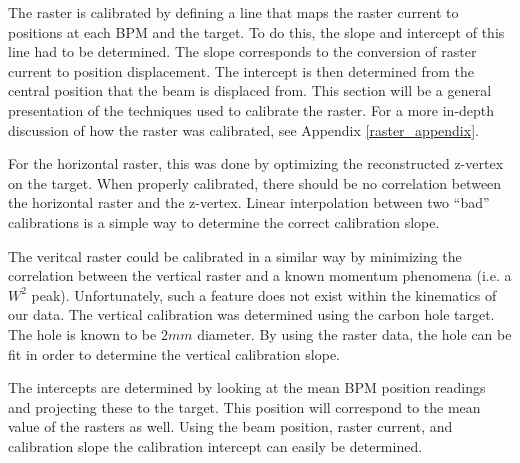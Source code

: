 The raster is calibrated by defining a line that maps the raster current to positions at each BPM and the target. To do this, the slope and intercept of this line had to be determined. The slope corresponds to the conversion of raster current to position displacement. The intercept is then determined from the central position that the beam is displaced from. This section will be a general presentation of the techniques used to calibrate the raster. For a more in-depth discussion of how the raster was calibrated, see Appendix \ref{raster_appendix}.

For the horizontal raster, this was done by optimizing the reconstructed z-vertex on the target. When properly calibrated, there should be no correlation between the horizontal raster and the z-vertex. Linear interpolation between two ``bad'' calibrations is a simple way to determine the correct calibration slope.

The veritcal raster could be calibrated in a similar way by minimizing the correlation between the vertical raster and a known momentum phenomena (i.e. a $W^2$ peak). Unfortunately, such a feature does not exist within the kinematics of our data. The vertical calibration was determined using the carbon hole target. The hole is known to be $2mm$ diameter. By using the raster data, the hole can be fit in order to determine the vertical calibration slope.

The intercepts are determined by looking at the mean BPM position readings and projecting these to the target. This position will correspond to the mean value of the rasters as well. Using the beam position, raster current, and calibration slope the calibration intercept can easily be determined.